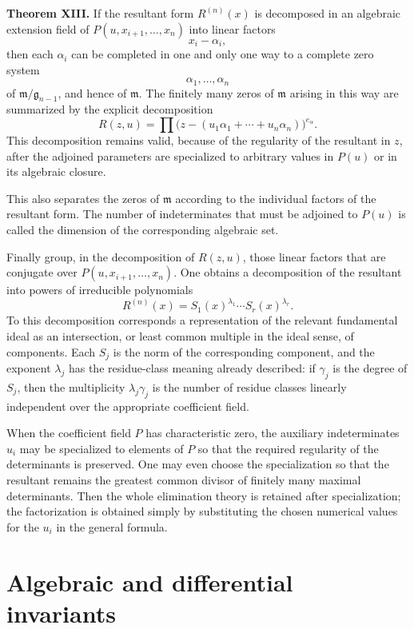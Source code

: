 \documentclass[11pt]{article}
\begin{document}
\textbf{Theorem XIII.} If the resultant form $R^{(n)}(x)$ is decomposed in an algebraic extension field of $P(u,x_{i+1},\ldots,x_n)$ into linear factors
\[
  x_i-\alpha_i,
\]
then each $\alpha_i$ can be completed in one and only one way to a complete zero system
\[
  \alpha_1,
\ldots,\alpha_n
\]
of $\mathfrak m/\mathfrak g_{n-1}$, and hence of $\mathfrak m$. The finitely many zeros of $\mathfrak m$ arising in this way are summarized by the explicit decomposition
\begin{equation}
  R(z,u)=\prod\bigl(z-(u_1\alpha_1+
\cdots+u_n\alpha_n)\bigr)^{e_\alpha}.           \tag{37}
\end{equation}
This decomposition remains valid, because of the regularity of the resultant in $z$, after the adjoined parameters are specialized to arbitrary values in $P(u)$ or in its algebraic closure.

This also separates the zeros of $\mathfrak m$ according to the individual factors of the resultant form. The number of indeterminates that must be adjoined to $P(u)$ is called the dimension of the corresponding algebraic set.

Finally group, in the decomposition of $R(z,u)$, those linear factors that are conjugate over $P(u,x_{i+1},\ldots,x_n)$. One obtains a decomposition of the resultant into powers of irreducible polynomials
\[
  R^{(n)}(x)=S_1(x)^{\lambda_1}\cdots S_r(x)^{\lambda_r}.
\]
To this decomposition corresponds a representation of the relevant fundamental ideal as an intersection, or least common multiple in the ideal sense, of components. Each $S_j$ is the norm of the corresponding component, and the exponent $\lambda_j$ has the residue-class meaning already described: if $\gamma_j$ is the degree of $S_j$, then the multiplicity $\lambda_j\gamma_j$ is the number of residue classes linearly independent over the appropriate coefficient field.

When the coefficient field $P$ has characteristic zero, the auxiliary indeterminates $u_i$ may be specialized to elements of $P$ so that the required regularity of the determinants is preserved. One may even choose the specialization so that the resultant remains the greatest common divisor of finitely many maximal determinants. Then the whole elimination theory is retained after specialization; the factorization is obtained simply by substituting the chosen numerical values for the $u_i$ in the general formula.

\newpage

\section{Algebraic and differential invariants}
\end{document}

